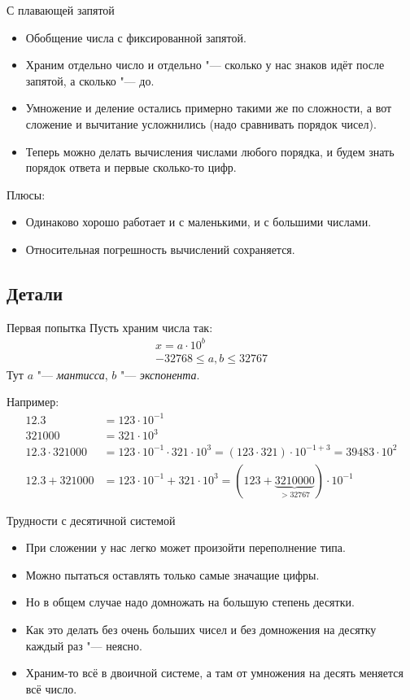 \begin{frame}{С плавающей запятой}
	\begin{itemize}
		\item
			Обобщение числа с фиксированной запятой.
		\item
			Храним отдельно число и отдельно "--- сколько у нас знаков идёт после запятой, а сколько "--- до.
		\item
			Умножение и деление остались примерно такими же по сложности, а вот сложение и вычитание усложнились (надо сравнивать порядок чисел).
		\item
			Теперь можно делать вычисления числами любого порядка, и будем знать порядок ответа и первые сколько-то цифр.
	\end{itemize}
	Плюсы:
	\begin{itemize}
		\item
			Одинаково хорошо работает и с маленькими, и с большими числами.
		\item
			Относительная погрешность вычислений сохраняется.
	\end{itemize}
\end{frame}

\subsection{Детали}
\begin{frame}{Первая попытка}
	Пусть храним числа так:
	\begin{gather*}
		x = a \cdot 10^{b} \\
		-32768 \le a, b \le 32767
	\end{gather*}
	Тут $a$ "--- \textit{мантисса}, $b$ "--- \textit{экспонента}.

	Например:
	\begin{align*}
		12.3 &= 123 \cdot 10^{-1} \\
		321000 &= 321 \cdot 10^3 \\
		12.3 \cdot 321000 &= 123 \cdot 10^{-1} \cdot 321 \cdot 10^3 = (123 \cdot 321) \cdot 10^{-1+3} = 39483 \cdot 10^2 \\
		12.3 + 321000 &= 123 \cdot 10^{-1} + 321 \cdot 10^3 = (123 + \underbrace{3210000}_{>32767}) \cdot 10^{-1}
	\end{align*}
\end{frame}

\begin{frame}{Трудности с десятичной системой}
	\begin{itemize}
		\item При сложении у нас легко может произойти переполнение типа.
		\item Можно пытаться оставлять только самые значащие цифры.
		\item Но в общем случае надо домножать на большую степень десятки.
		\item Как это делать без очень больших чисел и без домножения на десятку каждый раз "--- неясно.
		\item Храним-то всё в двоичной системе, а там от умножения на десять меняется всё число.
	\end{itemize}
\end{frame}

